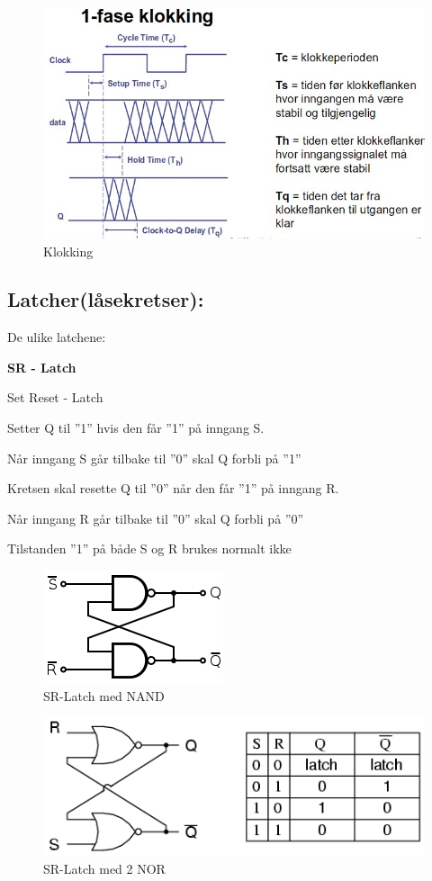 \documentclass{article}
\begin{document}
	\begin{figure}[H]
		\includegraphics[scale = 0.6]{klokking.jpg}
		\caption{Klokking}
	\end{figure}
	
	\subsection{Latcher(låsekretser):}
	De ulike latchene:
	
	\textbf{SR - Latch}
	
	Set Reset - Latch
	
	Setter Q  til ”1”  hvis den får ”1”  på inngang S. 
	
	Når inngang S går tilbake til ”0” skal Q forbli på ”1”
		
	Kretsen skal resette Q  til ”0”  når den får ”1”  på inngang R.
	
	Når inngang R går tilbake til ”0”  skal Q  forbli på ”0”
	
	Tilstanden ”1”  på både S  og R  brukes	normalt ikke
	
	\begin{figure}[H]
		\includegraphics[scale = 0.6]{srlatch.png}
		\caption{SR-Latch med NAND}
	\end{figure}
	
	\begin{figure}[H]
		\includegraphics[scale = 0.6]{srL.png}
		\caption{SR-Latch med 2 NOR}
	\end{figure}
	
\end{document}

